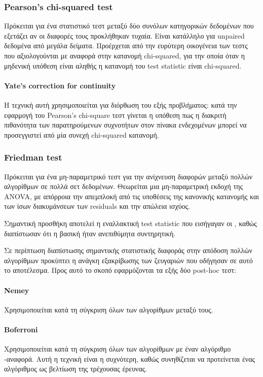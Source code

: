 \documentclass[]{article}
\numberwithin{equation}{section}		%
\numberwithin{figure}{section}			%
\numberwithin{table}{section}				%
\begin{document}
    \subsubsection{Pearson's chi-squared test} Πρόκειται για ένα στατιστικό τεστ μεταξύ δύο συνόλων κατηγορικών δεδομένων που εξετάζει αν οι διαφορές τους προκλήθηκαν τυχαία. Είναι κατάλληλο για unpaired δεδομένα από μεγάλα δείματα. Προέρχεται από την ευρύτερη οικογένεια των τεστς που αξιολογούνται με αναφορά στην κατανομή chi-squared, για την οποία όταν η μηδενική υπόθεση είναι αληθής η κατανομή του test statistic είναι chi-squared. 
    \paragraph{Yate's correction for continuity}
    Η τεχνική αυτή χρησιμοποιείται για διόρθωση του εξής προβλήματος: κατά την εφαρμογή του Pearson's chi-square τεστ γίνεται η υπόθεση πως η διακριτή πιθανότητα των παρατηρούμενων συχνοτήτων στον πίνακα ενδεχομένων μπορεί να προσεγγιστεί από μία συνεχή chi-squared κατανομή.
    \subsubsection{Friedman test}
    Πρόκειται για ένα μη-παραμετρικό τεστ για την ανίχνευση διαφορών μεταξύ πολλών αλγορίθμων σε πολλά σετ δεδομένων. Θεωρείται μια μη-παραμετρική εκδοχή της ANOVA, με απόρροια την απεμπλοκή από τις υποθέσεις της κανονικής κατανομής και των ίσων διακυμάνσεων των residuals και την απώλεια ισχύος.  
    
    Σημαντική προσθήκη αποτελεί η εναλλακτική test statistic που εισήγαγαν οι \cite{}, καθώς διαπίστωσαν ότι η βασική ήταν ανεπιθύμητα συντηρητική. 
    
    Σε περίπτωση διαπίστωσης σημαντικής στατιστικής διαφοράς στην απόδοση πολλών αλγορίθμων προκύπτει η ανάγκη εξακρίβωσης των ζευγαριών που οδήγησαν σε αυτό το αποτέλεσμα. Προς αυτό το σκοπό εφαρμόζονται τα εξής δύο post-hoc τεστ:
    \paragraph{Nemey} Χρησιμοποιείται κατά τη σύγκριση όλων των αλγορίθμων μεταξύ τους.
    \paragraph{Boferroni} Χρησιμοποιείται κατά τη σύγκριση όλων των αλγορίθμων με έναν αλγόριθμο -αναφορά. Αυτή η τεχνική είναι η συχνότερη, καθώς συνηθίζεται να προτείνεται ένας αλγόριθμος ως βελτίωση της τρέχουσας έρευνας.
\end{document}
